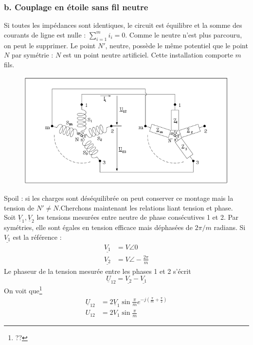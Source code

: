 		\subsubsection{b. Couplage en étoile sans fil neutre}
		Si toutes les impédances sont identiques, le circuit est équilibre et 
		la somme des courants de ligne est nulle : $\sum_{i=1}^m i_i=0$. Comme 
		le neutre n'est plus parcouru, on peut le supprimer. Le point $N'$, 
		neutre, possède le même potentiel que le point $N$ par symétrie : $N$ 
		est un point neutre artificiel. Cette installation comporte $m$ fils.\\
		\begin{figure}
		\vspace{-8mm}
		\includegraphics[scale=0.4]{ch1/image7.png}
		\end{figure}		
		Spoil : si les charges sont déséquilibrée on peut conserver ce montage 
		mais la tension de $N' \neq N$.Cherchons maintenant les relations liant 
		tension et phase.\\
		Soit $\underline{V}_1, \underline{V}_2$ les tensions mesurées entre 
		neutre de phase consécutives 1 et 2. Par symétries, elle sont égales 
		en tension efficace mais déphasées de $2\pi/m$ radians. Si $\underline{
		V_1}$ est la référence :
		\begin{equation}
		\begin{array}{ll}
		\underline{V_1} &= V\angle 0\\
		\underline{V_2} &= V\angle -\frac{2\pi}{m}
		\end{array}
		\end{equation}
		Le phaseur de la tension mesurée entre les phases 1 et 2 s'écrit
		\begin{equation}
		\underline{U}_{12} = \underline{V_2}-\underline{V_1}
		\end{equation}
		On voit que\footnote{??} 
		\begin{equation}
		\begin{array}{ll}
		\underline{U}_{12} &= 2\underline{V}_1\sin \frac{\pi}{m}e^{-j\left(
		\frac{\pi}{m}+\frac{\pi}{2}\right)}\\
		U_{12} &= 2V_1\sin\frac{\pi}{m}
		\end{array}
		\end{equation}
		
